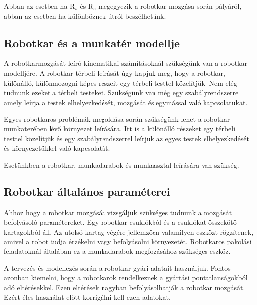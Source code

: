 Abban az esetben ha R$_s$ és R$_e$ megegyezik a robotkar mozgása során pályáról, abban az esetben ha különböznek útról beszélhetünk.


\subsection{Robotkar és a munkatér modellje}

A robotkarmozgását leíró kinematikai számításoknál szükségünk van a robotkar modelljére. A robotkar térbeli leírását úgy kapjuk meg, hogy a robotkar, különálló, különmozogni képes részeit egy térbeli testtel közelítjük. Nem elég tudnunk ezeket a térbeli testeket. Szükségünk van még egy szabályrendszerre amely leírja a testek elhelyezkedését, mozgását és egymással való kapcsolatukat.

Egyes robotkaros problémák megoldása során szükségünk lehet a robotkar munkaterében lévő környezet leírására. Itt is a különálló részeket egy térbeli testtel közelítjük és egy szabályrendszerrel leírjuk az egyes testek elhelyezkedését és környezetükkel való kapcsolatát.

Esetünkben a robotkar, munkadarabok és munkaasztal leírására van szükség.

\subsection{Robotkar általános paraméterei}
Ahhoz hogy a robotkar mozgását vizsgáljuk szükséges tudnunk a mozgását befolyásoló paramétereket. Egy robotkar csuklókból és a csuklókat összekötő kartagokból áll. Az utolsó kartag végére jellemzően valamilyen eszközt rögzítenek, amivel a robot tudja érzékelni vagy befolyásolni környezetét. Robotkaros pakolási feladatoknál általában ez a munkadarabok megfogásához szükséges eszköz.  

A tervezés és modellezés során a robotkar gyári adatait használjuk. Fontos azonban kiemelni, hogy a robotkarok rendelkeznek a gyártási pontatlanságokból adó eltérésekkel. Ezen eltérések nagyban befolyásolhatják a robotkar mozgását. Ezért éles használat előtt korrigálni kell ezen adatokat.

